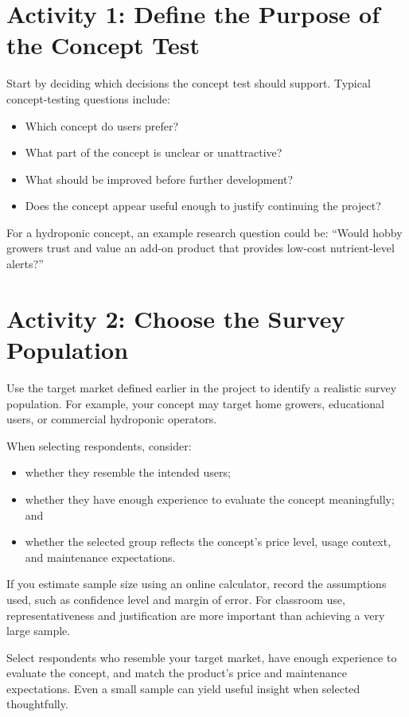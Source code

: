 \section{Activity 1: Define the Purpose of the Concept Test}

Start by deciding which decisions the concept test should support. Typical concept-testing questions include:
\begin{itemize}
    \item Which concept do users prefer?
    \item What part of the concept is unclear or unattractive?
    \item What should be improved before further development?
    \item Does the concept appear useful enough to justify continuing the project?
\end{itemize}

For a hydroponic concept, an example research question could be: ``Would hobby growers trust and value an add-on product that provides low-cost nutrient-level alerts?''

\section{Activity 2: Choose the Survey Population}

Use the target market defined earlier in the project to identify a realistic survey population. For example, your concept may target home growers, educational users, or commercial hydroponic operators.

When selecting respondents, consider:
\begin{itemize}
    \item whether they resemble the intended users;
    \item whether they have enough experience to evaluate the concept meaningfully; and
    \item whether the selected group reflects the concept's price level, usage context, and maintenance expectations.
\end{itemize}

If you estimate sample size using an online calculator, record the assumptions used, such as confidence level and margin of error. For classroom use, representativeness and justification are more important than achieving a very large sample.

\begin{tcolorbox}[title=Hint]
Select respondents who resemble your target market, have enough experience to evaluate the concept, and match the product's price and maintenance expectations. Even a small sample can yield useful insight when selected thoughtfully.
\end{tcolorbox}

